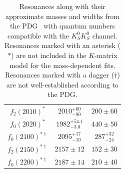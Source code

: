 \begin{table}
\begin{center}
\begin{tabular}{ccc}
      $f_2(2010)^{\ast}$ & $2010^{+60}_{-80}$ & $200\pm 60$ \\
      $f_0(2020)^{\ast}$ & $1982^{+54.1}_{-3.0}$ & $440\pm 50$ \\
      $f_0(2100)^{\ast\dagger}$ & $2095^{+17}_{-19}$ & $287^{+32}_{-24}$ \\
      $f_2(2150)^{\ast\dagger}$ & $2157\pm 12$ & $152\pm 30$ \\
      $f_0(2200)^{\ast\dagger}$ & $2187\pm 14$ & $210\pm 40$ \\\bottomrule
    \end{tabular}
    \caption{Resonances along with their approximate masses and widths from the PDG~\cite{Zyla2020} with quantum numbers compatible with the $K_S^0K_S^0$ channel. Resonances marked with an asterisk ($\ast$) are not included in the $K$-matrix model for the mass-dependent fits. Resonances marked with a dagger ($\dagger$) are not well-established according to the PDG.}\label{tab:pdg-resonances}
  \end{center}
\end{table}



